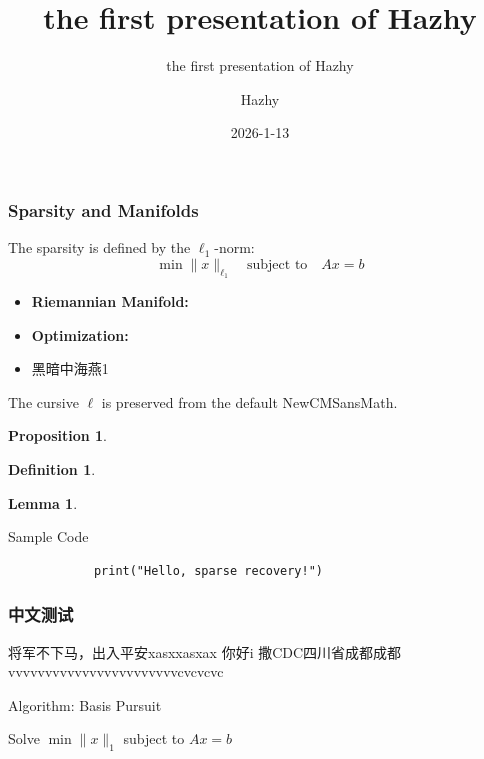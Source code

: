 \documentclass{ltx-talk}
\title{the first presentation of Hazhy}
\subtitle{the first presentation of Hazhy}
\author{Hazhy}
\institute{None}
\date{2026-1-13}
\newtheorem*{lemma}{Lemma}
\newtheorem*{definition}{Definition}
\newtheorem*{proposition}{Proposition}
\begin{document}
	\maketitle
	
	\begin{frame} 
		\frametitle{Sparsity and Manifolds}
		The sparsity is defined by the $\ell_1$-norm:
		\[ \min \|x\|_{\ell_1} \quad \text{subject to} \quad Ax = b \]
		
		\begin{itemize}
			\item \textbf{Riemannian Manifold:} 
			\item \textbf{Optimization:} 
			\item  黑暗中海燕1
		\end{itemize}
		
		The cursive $\ell$ is preserved from the default NewCMSansMath.
	\end{frame}

	\begin{frame}
	
		\begin{proposition}
			
		\end{proposition}
		\begin{definition}
			
		\end{definition}
		\begin{lemma}
			
		\end{lemma}
	\end{frame}
	
	
	\begin{frame*}{Sample Code}
		
		\begin{verbatim}
			print("Hello, sparse recovery!")
		\end{verbatim}
		
		
	\end{frame*}
	
	
	
	\begin{frame}
		\frametitle{中文测试}
		将军不下马，出入平安xasxxasxax
		你好i 撒CDC四川省成都成都vvvvvvvvvvvvvvvvvvvvvvvcvcvcvc
	\end{frame}
	
	\begin{frame}{Algorithm: Basis Pursuit}
		\begin{algorithm}[H]
			\caption{L1-Minimization}
			Solve $\min \|x\|_1$ subject to $Ax = b$\;
		\end{algorithm}
	\end{frame}
	
\end{document}
